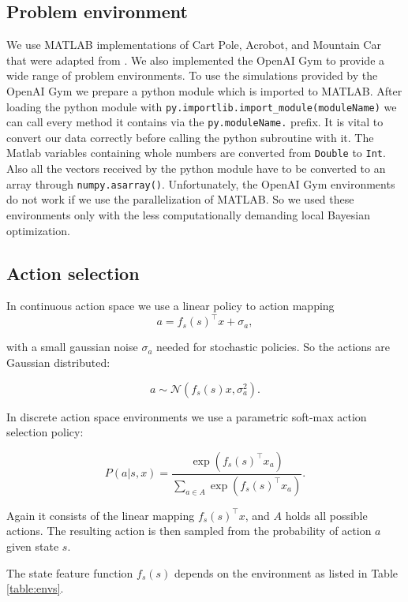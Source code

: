 \subsection{Problem environment}
We use MATLAB implementations of Cart Pole, Acrobot, and Mountain Car that were adapted from \cite{joseCode}. We also implemented the OpenAI Gym to provide a wide range of problem environments. To use the simulations provided by the OpenAI Gym we prepare a python module which is imported to MATLAB. After loading the python module with \verb|py.importlib.import_module(moduleName)| we can call every method it contains via the \verb|py.moduleName.| prefix. It is vital to convert our data correctly before calling the python subroutine with it. The Matlab variables containing whole numbers are converted from \verb|Double| to \verb|Int|. Also all the vectors received by the python module have to be converted to an array through \verb|numpy.asarray()|. Unfortunately, the OpenAI Gym environments do not work if we use the parallelization of MATLAB. So we used these environments only with the less computationally demanding local Bayesian optimization.\\

\subsection{Action selection}
\label{sec:actionselection}
In continuous action space we use a linear policy to action mapping
\begin{equation} \label{eq:actionselection}
    a = f_s(s)^\top x + \sigma_a,
\end{equation}

with a small gaussian noise $\sigma_a$ needed for stochastic policies. So the actions are Gaussian distributed:

$$a \sim \mathcal{N}(f_s(s) x,\sigma_a^2).$$

In discrete action space environments we use a parametric soft-max action selection policy:

\begin{equation} \label{eq:discreteactionselection}
    P(a|s,x)= \frac{\exp(f_s(s)^\top x_a)}{\sum_{a\in A} \exp(f_s(s)^\top x_a)}.
\end{equation}

Again it consists of the linear mapping $f_s(s)^\top x$, and $A$ holds all possible actions. The resulting action is then sampled from the probability of action $a$ given state $s$.

The state feature function $f_s(s)$ depends on the environment as listed in Table \ref{table:envs}.

